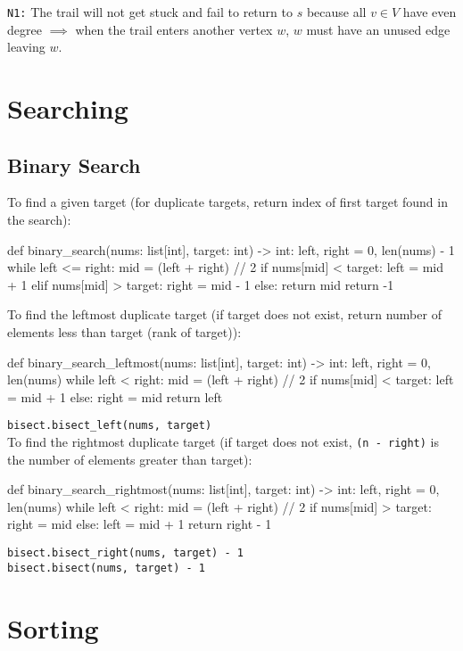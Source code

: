 \documentclass[12pt, titlepage]{article}
\begin{document}
\texttt{N1:} The trail will not get stuck and fail to return to $s$ because all $v \in V$ have even degree $\implies$ when the trail enters another vertex $w$, $w$ must have an unused edge leaving $w$.

\section{Searching}

\subsection{Binary Search}
To find a given target (for duplicate targets, return index of first target found in the search):
\begin{python}
def binary_search(nums: list[int], target: int) -> int:
    left, right = 0, len(nums) - 1
    while left <= right:
        mid = (left + right) // 2
        if nums[mid] < target:
            left = mid + 1
        elif nums[mid] > target:
            right = mid - 1
        else:
            return mid
    return -1
\end{python}
\bigskip

To find the leftmost duplicate target (if target does not exist, return number of elements less than target (rank of target)):
\begin{python}
def binary_search_leftmost(nums: list[int], target: int) -> int:
    left, right = 0, len(nums)
    while left < right:
        mid = (left + right) // 2
        if nums[mid] < target:
            left = mid + 1
        else:
            right = mid
    return left
\end{python}
\texttt{bisect.bisect\_left(nums, target)} \\

To find the rightmost duplicate target (if target does not exist, \texttt{(n - right)} is the number of elements greater than target):
\begin{python}
def binary_search_rightmost(nums: list[int], target: int) -> int:
    left, right = 0, len(nums)
    while left < right:
        mid = (left + right) // 2
        if nums[mid] > target:
            right = mid
        else:
            left = mid + 1
    return right - 1
\end{python}
\texttt{bisect.bisect\_right(nums, target) - 1} \\
\texttt{bisect.bisect(nums, target) - 1}

\section{Sorting}
\end{document}
